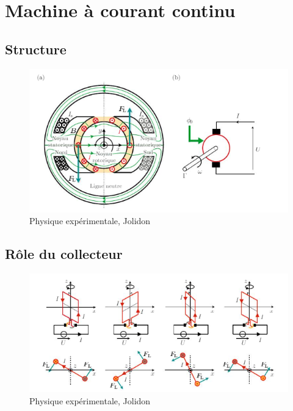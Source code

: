 \documentclass[10pt]{beamer}
\begin{document}
\section{Machine à courant continu}
\subsection{Structure}
\begin{frame}{\insertsubsection}
    \begin{figure}
        \centering
        \includegraphics[width=1\textwidth]{StructureMCC.png}
        \caption{Physique expérimentale, Jolidon}
    \end{figure}
\end{frame}

\subsection{Rôle du collecteur}

\begin{frame}{\insertsubsection}
    \begin{figure}
        \centering
        \includegraphics[width=1\textwidth]{RotorCollecteur.png}
        \caption{Physique expérimentale, Jolidon}
    \end{figure}
\end{frame}
\end{document}
